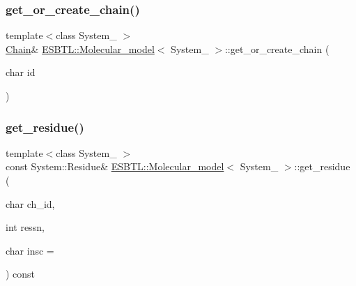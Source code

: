 \subsubsection{\texorpdfstring{get\+\_\+or\+\_\+create\+\_\+chain()}{get\_or\_create\_chain()}\hspace{0.1cm}{\footnotesize\ttfamily [2/2]}}
{\footnotesize\ttfamily template$<$class System\+\_\+ $>$ \\
\hyperlink{classESBTL_1_1Molecular__model_a1d055eb841e64e198a1987e120fc985d}{Chain}\& \hyperlink{classESBTL_1_1Molecular__model}{E\+S\+B\+T\+L\+::\+Molecular\+\_\+model}$<$ System\+\_\+ $>$\+::get\+\_\+or\+\_\+create\+\_\+chain (\begin{DoxyParamCaption}\item[{char}]{id }\end{DoxyParamCaption})\hspace{0.3cm}{\ttfamily [inline]}}

\mbox{\label{classESBTL_1_1Molecular__model_a27690579404665ca7e0de0cb236c7f9b}} 
\subsubsection{\texorpdfstring{get\+\_\+residue()}{get\_residue()}}
{\footnotesize\ttfamily template$<$class System\+\_\+ $>$ \\
const System\+::\+Residue\& \hyperlink{classESBTL_1_1Molecular__model}{E\+S\+B\+T\+L\+::\+Molecular\+\_\+model}$<$ System\+\_\+ $>$\+::get\+\_\+residue (\begin{DoxyParamCaption}\item[{char}]{ch\+\_\+id,  }\item[{int}]{ressn,  }\item[{char}]{insc = {\ttfamily \textquotesingle{}~\textquotesingle{}} }\end{DoxyParamCaption}) const\hspace{0.3cm}{\ttfamily [inline]}}

\mbox{\label{classESBTL_1_1Molecular__model_add37093d0628999609a736fe19d2779a}} 
